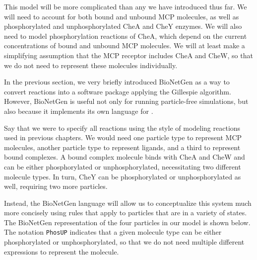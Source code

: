 This model will be more complicated than any we have introduced thus far. We will need to account for both bound and unbound MCP molecules, as well as phosphorylated and unphosphorylated CheA and CheY enzymes. We will also need to model phosphorylation reactions of CheA, which depend on the current concentrations of bound and unbound MCP molecules. We will at least make a simplifying assumption that the MCP receptor includes CheA and CheW, so that we do not need to represent these molecules individually.

In the previous section, we very briefly introduced BioNetGen as a way to convert reactions into a software package applying the Gillespie algorithm. However, BioNetGen is useful not only for running particle-free simulations, but also because it implements its own language for .

Say that we were to specify all reactions using the style of modeling reactions used in previous chapters. We would need one particle type to represent MCP molecules, another particle type to represent ligands, and a third to represent bound complexes. A bound complex molecule binds with CheA and CheW and can be either phosphorylated or unphosphorylated, necessitating two different molecule types. In turn, CheY can be phosphorylated or unphosphorylated as well, requiring two more particles.

Instead, the BioNetGen language will allow us to conceptualize this system much more concisely using rules that apply to particles that are in a variety of states. The BioNetGen representation of the four particles in our model is shown below. The notation \texttt{Phos\texttildelow U\texttildelow P} indicates that a given molecule type can be either phosphorylated or unphosphorylated, so that we do not need multiple different expressions to represent the molecule.\\

